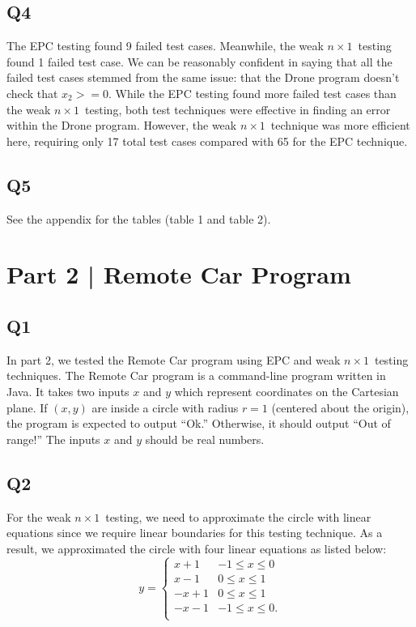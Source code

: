 \documentclass[12pt, letterpaper, titlepage]{article}
\newcommand{\nx}{$n\times1$}
\begin{document}
\subsection*{Q4}
The EPC testing found 9 failed test cases. Meanwhile, the weak \nx\ testing found 1 failed test case. We can be reasonably confident in saying that all the failed test cases stemmed from the same issue: that the Drone program doesn't check that $x_2>=0$. While the EPC testing found more failed test cases than the weak \nx\ testing, both test techniques were effective in finding an error within the Drone program. However, the weak \nx\ technique was more efficient here, requiring only 17 total test cases compared with 65 for the EPC technique.

\subsection*{Q5}
See the appendix for the tables (table 1 and table 2).

\section{Part 2 | Remote Car Program}
\subsection*{Q1}
In part 2, we tested the Remote Car program using EPC and weak \nx\ testing techniques. The Remote Car program is a command-line program written in Java. It takes two inputs $x$ and $y$ which represent coordinates on the Cartesian plane. If $(x,y)$ are inside a circle with radius $r = 1$ (centered about the origin), the program is expected to output ``Ok.'' Otherwise, it should output ``Out of range!'' The inputs $x$ and $y$ should be real numbers.

\subsection*{Q2}
For the weak \nx\ testing, we need to approximate the circle with linear equations since we require linear boundaries for this testing technique. As a result, we approximated the circle with four linear equations as listed below:
\begin{equation}
    y = \begin{cases}
        x + 1 & -1 \leq x \leq 0 \\
        x - 1 & 0 \leq x \leq 1 \\
        -x + 1 & 0 \leq x \leq 1 \\
        -x - 1 & -1 \leq x \leq 0. \\
    \end{cases}
\end{equation}
\end{document}
